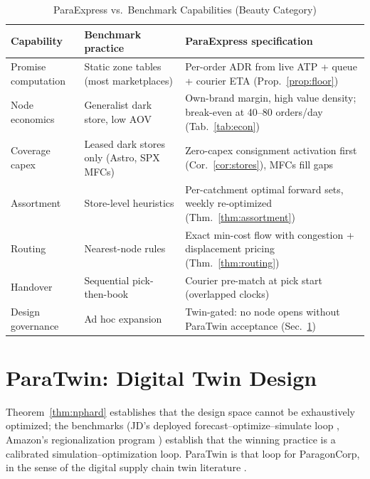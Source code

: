 \documentclass[journal]{IEEEtran}
\begin{document}
\begin{table}[!t]
\caption{ParaExpress vs.\ Benchmark Capabilities (Beauty Category)}
\label{tab:superiority}
\centering
\scriptsize
\begin{tabularx}{\columnwidth}{@{}X X X@{}}
\toprule
\textbf{Capability} & \textbf{Benchmark practice} & \textbf{ParaExpress specification} \\
\midrule
Promise computation & Static zone tables (most marketplaces) & Per-order ADR from live ATP + queue + courier ETA (Prop.~\ref{prop:floor}) \\
Node economics & Generalist dark store, low AOV & Own-brand margin, high value density; break-even at 40--80 orders/day (Tab.~\ref{tab:econ}) \\
Coverage capex & Leased dark stores only (Astro, SPX MFCs) & Zero-capex consignment activation first (Cor.~\ref{cor:stores}), MFCs fill gaps \\
Assortment & Store-level heuristics & Per-catchment optimal forward sets, weekly re-optimized (Thm.~\ref{thm:assortment}) \\
Routing & Nearest-node rules & Exact min-cost flow with congestion + displacement pricing (Thm.~\ref{thm:routing}) \\
Handover & Sequential pick-then-book & Courier pre-match at pick start (overlapped clocks) \\
Design governance & Ad hoc expansion & Twin-gated: no node opens without ParaTwin acceptance (Sec.~\ref{sec:twin}) \\
\bottomrule
\end{tabularx}
\end{table}

\section{ParaTwin: Digital Twin Design}
\label{sec:twin}
Theorem~\ref{thm:nphard} establishes that the design space cannot be exhaustively optimized; the benchmarks (JD's deployed forecast--optimize--simulate loop \cite{jdassort}, Amazon's regionalization program \cite{amazonregional}) establish that the winning practice is a calibrated simulation--optimization loop. ParaTwin is that loop for ParagonCorp, in the sense of the digital supply chain twin literature \cite{ivanov,lefan,snoeck}.
\end{document}
